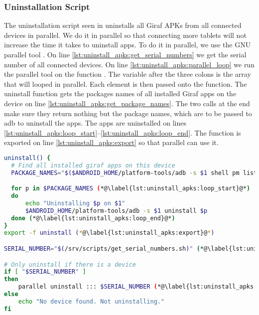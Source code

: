 \subsubsection{Uninstallation Script}
 The uninstallation script seen in  uninstalls all Giraf APKs from all connected devices in parallel. We do it in parallel so that connecting more tablets will not increase the time it takes to uninstall apps. To do it in parallel, we use the GNU parallel tool \parencite{Tange2011a}. On line \ref{lst:uninstall_apks:get_serial_numbers} we get the serial number of all connected devices. On line \ref{lst:uninstall_apks:parallel_loop} we run the parallel tool on the function . The variable  after the three colons is the array that will looped in parallel. Each element is then passed onto the  function. The uninstall function gets the packages names of all installed Giraf apps on the device on line \ref{lst:uninstall_apks:get_package_names}. The two  calls at the end make sure they return nothing but the package names, which are to be passed to adb to uninstall the apps. The apps are uninstalled on lines \ref{lst:uninstall_apks:loop_start}--\ref{lst:uninstall_apks:loop_end}. The function is exported on line \ref{lst:uninstall_apks:export} so that parallel can use it.
  \begin{lstlisting}[language=bash,caption=Script that uninstalls all installed Giraf apps on all devices,label=lst:uninstall_apks]
uninstall() {
  # Find all installed giraf apps on this device
  PACKAGE_NAMES="$($ANDROID_HOME/platform-tools/adb -s $1 shell pm list packages -f | grep dk.aau.cs.giraf | sed 's/.*apk=//' | sed 's/\s*//g')" (*@\label{lst:uninstall_apks:get_package_names}@*)

  for p in $PACKAGE_NAMES (*@\label{lst:uninstall_apks:loop_start}@*)
  do
      echo "Uninstalling $p on $1"
      $ANDROID_HOME/platform-tools/adb -s $1 uninstall $p
  done (*@\label{lst:uninstall_apks:loop_end}@*)
}
export -f uninstall (*@\label{lst:uninstall_apks:export}@*)

SERIAL_NUMBER="$(/srv/scripts/get_serial_numbers.sh)" (*@\label{lst:uninstall_apks:get_serial_numbers}@*)

# Only uninstall if there is a device
if [ "$SERIAL_NUMBER" ]
then
    parallel uninstall ::: $SERIAL_NUMBER (*@\label{lst:uninstall_apks:parallel_loop}@*)
else
    echo "No device found. Not uninstalling."
fi
  \end{lstlisting}

